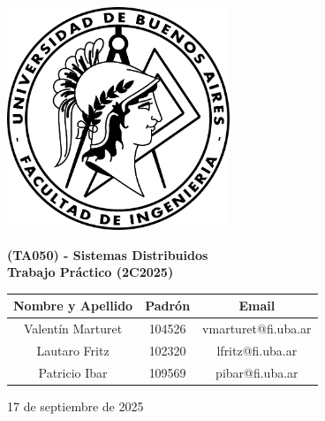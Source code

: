\documentclass{article}
\begin{document}
    
    
    \begin{center}
        \includegraphics[width=0.5\textwidth]
        {imagenes/Logo-fiuba.png}

        \vspace{1cm}
        {\LARGE \textbf{(TA050) - Sistemas Distribuidos}} \\
        \vspace{1cm}
        {\LARGE \textbf{Trabajo Práctico (2C2025)}} \\
        \vspace{1cm}
        \begin{table}[h]
            \centering
            \begin{tabular}{c c c}
                \hline
                \textbf{Nombre y Apellido} & \textbf{Padrón} & \textbf{Email} \\ \hline
                Valentín Marturet & 104526 & vmarturet@fi.uba.ar \\
                Lautaro Fritz & 102320 & lfritz@fi.uba.ar \\
                Patricio Ibar & 109569 & pibar@fi.uba.ar \\
                \hline
            \end{tabular}
        \end{table}

        \vspace{1cm}

        17 de septiembre de 2025

    \end{center}

    \newpage

    \tableofcontents
    \newpage

    
    

    \newpage

    
\end{document}
